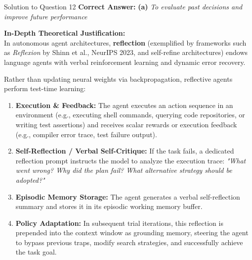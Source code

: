 \documentclass[11pt,a4paper]{article}
\begin{document}
\bigskip

\begin{solutionbox}{Solution to Question 12}
\textbf{Correct Answer:} \textbf{(a)} \textit{To evaluate past decisions and improve future performance}

\medskip
\textbf{In-Depth Theoretical Justification:}\\
In autonomous agent architectures, \textbf{reflection} (exemplified by frameworks such as \textit{Reflexion} by Shinn et al., NeurIPS 2023, and self-refine architectures) endows language agents with verbal reinforcement learning and dynamic error recovery.

Rather than updating neural weights via backpropagation, reflective agents perform test-time learning:
\begin{enumerate}[label=\textbf{\arabic*.}]
    \item \textbf{Execution \& Feedback:} The agent executes an action sequence in an environment (e.g., executing shell commands, querying code repositories, or writing test assertions) and receives scalar rewards or execution feedback (e.g., compiler error trace, test failure output).
    \item \textbf{Self-Reflection / Verbal Self-Critique:} If the task fails, a dedicated reflection prompt instructs the model to analyze the execution trace: \textit{"What went wrong? Why did the plan fail? What alternative strategy should be adopted?"}
    \item \textbf{Episodic Memory Storage:} The agent generates a verbal self-reflection summary and stores it in its episodic working memory buffer.
    \item \textbf{Policy Adaptation:} In subsequent trial iterations, this reflection is prepended into the context window as grounding memory, steering the agent to bypass previous traps, modify search strategies, and successfully achieve the task goal.
\end{enumerate}


\end{solutionbox}
\end{document}
